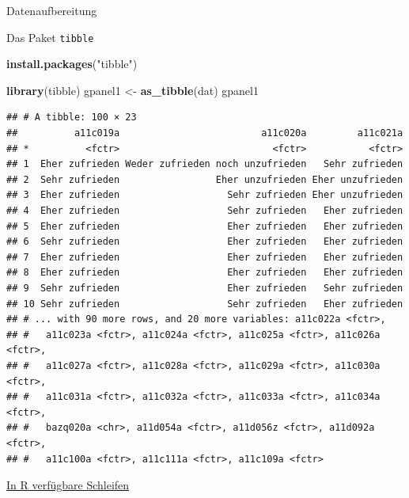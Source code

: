 \documentclass[ignorenonframetext,]{beamer}
\newenvironment{Shaded}{}{}
\newcommand{\KeywordTok}[1]{\textcolor[rgb]{0.00,0.44,0.13}{\textbf{{#1}}}}
\newcommand{\StringTok}[1]{\textcolor[rgb]{0.25,0.44,0.63}{{#1}}}
\newcommand{\NormalTok}[1]{{#1}}
\begin{document}
\begin{frame}[fragile]{Datenaufbereitung}
\begin{block}{Das Paket \texttt{tibble}}
\begin{Shaded}
\begin{Highlighting}[]
\KeywordTok{install.packages}\NormalTok{(}\StringTok{"tibble"}\NormalTok{)}
\end{Highlighting}
\end{Shaded}

\begin{Shaded}
\begin{Highlighting}[]
\KeywordTok{library}\NormalTok{(tibble)}
\NormalTok{gpanel1 <-}\StringTok{ }\KeywordTok{as_tibble}\NormalTok{(dat)}
\NormalTok{gpanel1}
\end{Highlighting}
\end{Shaded}

\begin{verbatim}
## # A tibble: 100 × 23
##          a11c019a                         a11c020a         a11c021a
## *          <fctr>                           <fctr>           <fctr>
## 1  Eher zufrieden Weder zufrieden noch unzufrieden   Sehr zufrieden
## 2  Sehr zufrieden                 Eher unzufrieden Eher unzufrieden
## 3  Eher zufrieden                   Sehr zufrieden Eher unzufrieden
## 4  Eher zufrieden                   Sehr zufrieden   Eher zufrieden
## 5  Eher zufrieden                   Eher zufrieden   Eher zufrieden
## 6  Sehr zufrieden                   Eher zufrieden   Eher zufrieden
## 7  Eher zufrieden                   Eher zufrieden   Eher zufrieden
## 8  Eher zufrieden                   Eher zufrieden   Eher zufrieden
## 9  Sehr zufrieden                   Eher zufrieden   Sehr zufrieden
## 10 Sehr zufrieden                   Sehr zufrieden   Eher zufrieden
## # ... with 90 more rows, and 20 more variables: a11c022a <fctr>,
## #   a11c023a <fctr>, a11c024a <fctr>, a11c025a <fctr>, a11c026a <fctr>,
## #   a11c027a <fctr>, a11c028a <fctr>, a11c029a <fctr>, a11c030a <fctr>,
## #   a11c031a <fctr>, a11c032a <fctr>, a11c033a <fctr>, a11c034a <fctr>,
## #   bazq020a <chr>, a11d054a <fctr>, a11d056z <fctr>, a11d092a <fctr>,
## #   a11c100a <fctr>, a11c111a <fctr>, a11c109a <fctr>
\end{verbatim}

\end{block}

\begin{block}{\href{https://www.datacamp.com/community/tutorials/tutorial-on-loops-in-r\#gs.e=BY75k}{In
R verfügbare Schleifen}}


\end{block}
\end{frame}
\end{document}

